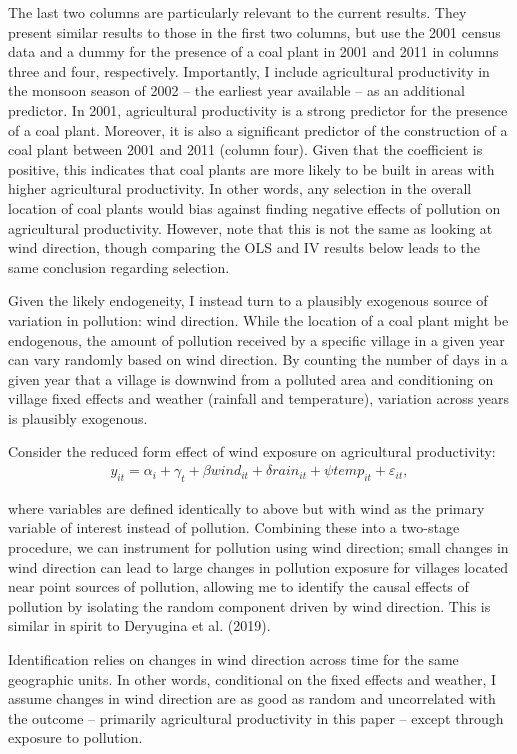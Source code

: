 \documentclass[
]{article}
\begin{document}
The last two columns are particularly relevant to the current results. They present similar results to those in the first two columns, but use the 2001 census data and a dummy for the presence of a coal plant in 2001 and 2011 in columns three and four, respectively. Importantly, I include agricultural productivity in the monsoon season of 2002 -- the earliest year available -- as an additional predictor. In 2001, agricultural productivity is a strong predictor for the presence of a coal plant. Moreover, it is also a significant predictor of the construction of a coal plant between 2001 and 2011 (column four). Given that the coefficient is positive, this indicates that coal plants are more likely to be built in areas with higher agricultural productivity. In other words, any selection in the overall location of coal plants would bias against finding negative effects of pollution on agricultural productivity. However, note that this is not the same as looking at wind direction, though comparing the OLS and IV results below leads to the same conclusion regarding selection.

Given the likely endogeneity, I instead turn to a plausibly exogenous source of variation in pollution: wind direction. While the location of a coal plant might be endogenous, the amount of pollution received by a specific village in a given year can vary randomly based on wind direction. By counting the number of days in a given year that a village is downwind from a polluted area and conditioning on village fixed effects and weather (rainfall and temperature), variation across years is plausibly exogenous.

Consider the reduced form effect of wind exposure on agricultural productivity:
\begin{gather} y_{it} = \alpha_{i} + \gamma_{t} + \beta wind_{it} + \delta rain_{it} + \psi temp_{it} + \varepsilon_{it}, \end{gather}

where variables are defined identically to above but with wind as the primary variable of interest instead of pollution. Combining these into a two-stage procedure, we can instrument for pollution using wind direction; small changes in wind direction can lead to large changes in pollution exposure for villages located near point sources of pollution, allowing me to identify the causal effects of pollution by isolating the random component driven by wind direction. This is similar in spirit to Deryugina et al. (2019).

Identification relies on changes in wind direction across time for the same geographic units. In other words, conditional on the fixed effects and weather, I assume changes in wind direction are as good as random and uncorrelated with the outcome -- primarily agricultural productivity in this paper -- except through exposure to pollution.
\end{document}
